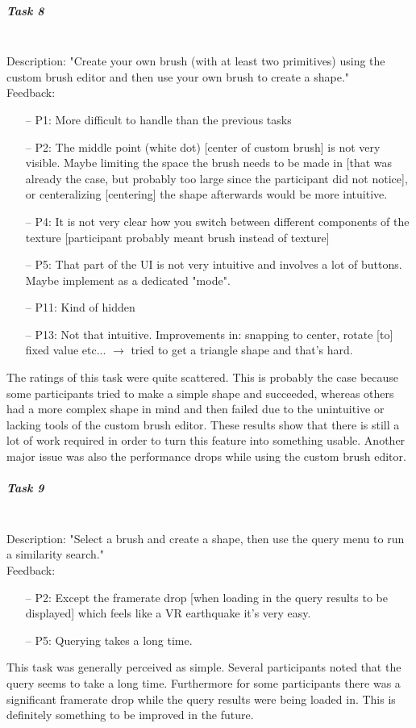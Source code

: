 \subparagraph{Task 8} \hfill \\
Description: "Create your own brush (with at least two primitives) using the custom brush editor and then use your own brush to create a shape."\\
Feedback:
\begin{enumerate} \setlength\itemsep{-0.5em}
	\item[--] P1: More difficult to handle than the previous tasks
	\item[--] P2: The middle point (white dot) [center of custom brush] is not very visible. Maybe limiting the space the brush needs to be made in [that was already the case, but probably too large since the participant did not notice], or centeralizing [centering] the shape afterwards would be more intuitive.
	\item[--] P4: It is not very clear how you switch between different components of the texture [participant probably meant brush instead of texture]
	\item[--] P5: That part of the UI is not very intuitive and involves a lot of buttons. Maybe implement as a dedicated "mode".
	\item[--] P11: Kind of hidden
	\item[--] P13: Not that intuitive. Improvements in: snapping to center, rotate [to] fixed value etc... $\rightarrow$ tried to get a triangle shape and that's hard.
\end{enumerate}
The ratings of this task were quite scattered. This is probably the case because some participants tried to make a simple shape and succeeded, whereas others had a more complex shape in mind and then failed due to the unintuitive or lacking
tools of the custom brush editor. These results show that there is still a lot of work required in order to turn this feature into something usable. Another major issue was also the performance drops while using the custom brush editor.

\subparagraph{Task 9} \hfill \\
Description: "Select a brush and create a shape, then use the query menu to run a similarity search."\\
Feedback:
\begin{enumerate} \setlength\itemsep{-0.5em}
	\item[--] P2: Except the framerate drop [when loading in the query results to be displayed] which feels like a VR earthquake it's very easy.
	\item[--] P5: Querying takes a long time.
\end{enumerate}
This task was generally perceived as simple. Several participants noted that the query seems to take a long time. Furthermore for some participants there was a significant framerate drop while the query results were being loaded in. This is definitely something to be improved in the future.

